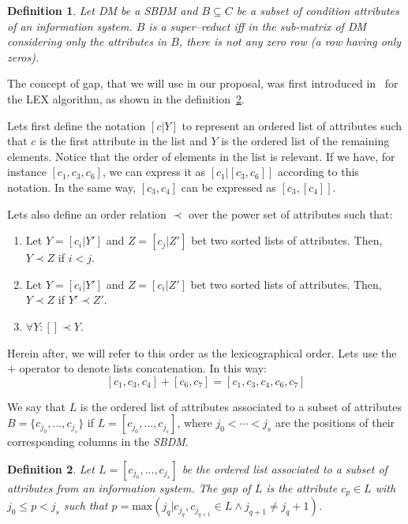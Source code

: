 \documentclass[number,preprint,review,12pt]{elsarticle}
\newtheorem{definition}{Definition}
\begin{document}
	\begin{definition}\label{def:testor}
		Let DM be a SBDM and $B \subseteq C$ be a subset of condition attributes of an information system. $B$ is a super--reduct iff in the sub-matrix of DM considering only the attributes in $B$, there is not any zero row (a row having only zeros).
	\end{definition}
	
	The concept of gap, that we will use in our proposal, was first introduced in~\cite{Santiesteban03} for the LEX algorithm, as shown in the definition~\ref{def:gap}.
	
	Lets first define the notation $[c|Y]$ to represent an ordered list of attributes such that $c$ is the first attribute in the list and $Y$ is the ordered list of the remaining elements. Notice that the order of elements in the list is relevant. If we have, for instance $[c_1,c_3,c_6]$, we can express it as $[c_1|[c_3,c_6]]$ according to this notation. In the same way, $[c_3,c_4]$ can be expressed as $[c_3,[c_4]]$.
	
	Lets also define an order relation $\prec$ over the power set of attributes such that:
	\begin{enumerate}
		\item Let $Y=[c_i|Y']$ and $Z=[c_j|Z']$ bet two sorted lists of attributes. Then, $Y \prec Z$ if $i<j$.
		\item Let $Y=[c_i|Y']$ and $Z=[c_i|Z']$ bet two sorted lists of attributes. Then, $Y \prec Z$ if $Y' \prec Z'$.
		\item $\forall Y:  [] \prec Y$.
	\end{enumerate}
	Herein after, we will refer to this order as the lexicographical order. Lets use the $+$ operator to denote lists concatenation. In this way: $$[c_1,c_3,c_4]+[c_6,c_7]=[c_1,c_3,c_4,c_6,c_7]$$
		
	We say that $L$ is the ordered list of attributes associated to a subset of attributes $B = \lbrace c_{j_0},...,c_{j_s} \rbrace$ if $L = [c_{j_0},...,c_{j_s}]$, where $j_0<\cdots <j_s$ are the positions of their corresponding columns in the \textit{SBDM}.
	
	\begin{definition}\label{def:gap}
		Let $L = [c_{j_0},...,c_{j_s}]$ be the ordered list associated to a subset of attributes from an information system. The gap of $L$ is the attribute $c_p \in L$ with $j_0 \leq p <	j_s$ such that $p=\mathrm{max}(j_q | c_{j_q},c_{j_{q+1}} \in L \wedge j_{q+1} \neq j_q+1)$.
	\end{definition}
	
\end{document}
